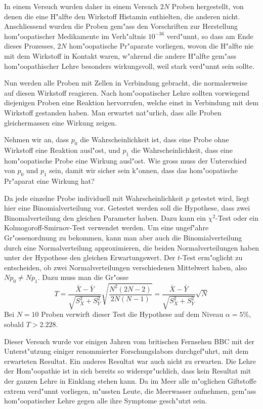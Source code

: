 In einem Versuch wurden daher in einem Versuch $2N$ Proben hergestellt,
von denen die eine H"alfte den Wirkstoff Histamin enthielten, die anderen 
nicht.
Anschliessend wurden die Proben gem"ass den Vorschriften zur
Herstellung hom"oopatischer Medikamente im Verh"altnis $10^{-36}$
verd"unnt, so dass am Ende dieses Prozesses, $2N$ hom"oopatische
Pr"aparate vorliegen, wovon die H"alfte nie mit dem Wirkstoff in
Kontakt waren, w"ahrend die andere H"alfte gem"ass hom"oopathischer
Lehre besonders wirkungsvoll, weil stark verd"unnt sein sollte.

Nun werden alle Proben mit Zellen in Verbindung gebracht, die normalerweise
auf diesen Wirkstoff reagieren.
Nach hom"oopatischer Lehre sollten vorwiegend
diejenigen Proben eine Reaktion hervorrufen, welche einst in Verbindung
mit dem Wirkstoff gestanden haben.
Man erwartet nat"urlich, dass 
alle Proben gleichermassen eine Wirkung zeigen.

Nehmen wir an, dass $p_0$ die Wahrscheinlichkeit ist, dass eine Probe ohne
Wirkstoff eine Reaktion ausl"ost, und $p_1$ die Wahrscheinlichkeit, dass
eine hom"oopatische Probe eine Wirkung ausl"ost.
Wie gross muss der Unterschied
von $p_0$ und $p_1$ sein, damit wir sicher sein k"onnen, dass das hom"oopatische
Pr"aparat eine Wirkung hat?

Da jede einzelne Probe individuell mit Wahrscheinlichkeit $p$ getestet wird, liegt
hier eine Binomialverteilung vor.
Getestet werden soll die Hypothese, dass zwei
Binomalverteilung den gleichen Parameter haben.
Dazu kann ein $\chi^2$-Test oder
ein Kolmogoroff-Smirnov-Test verwendet werden.
Um eine ungef"ahre Gr"ossenordnung
zu bekommen, kann man aber auch die Binomialverteilung durch eine Normalverteilung
approximieren, die beiden Normalverteilungen haben unter der Hypothese den
gleichen Erwartungswert.
Der $t$-Test erm"oglicht zu entscheiden, ob zwei Normalverteilungen
verschiedenen Mittelwert haben, also $Np_0\ne Np_1$.
Dazu muss man die
Gr"osse
$$T=\frac{\bar X - \bar Y}{\sqrt{S_X^2+S_Y^2}}\sqrt{\frac{N^2(2N-2)}{{2N}{(N-1)}}}
=
\frac{\bar X - \bar Y}{\sqrt{S_X^2+S_Y^2}}\sqrt{N}$$
Bei $N=10$ Proben verwirft dieser Test die Hypothese
auf dem Niveau $\alpha=5\%$, sobald
$T>2.228$.

Dieser Versuch wurde vor einigen Jahren vom britischen Fernsehen BBC mit der
Unterst"utzung einiger renommierter Forschungslabors durchgef"uhrt, mit dem
erwarteten Resultat.
Ein anderes Resultat war auch nicht zu erwarten.
Die Lehre der Hom"oopathie
ist in sich bereits so widerspr"uchlich, dass kein Resultat mit der ganzen
Lehre in Einklang stehen kann.
Da im Meer alle m"oglichen Giftstoffe extrem verd"unnt vorliegen, m"ussten
Leute, die Meerwasser aufnehmen, gem"ass hom"oopatischer Lehre gegen alle
ihre Symptome gesch"utzt sein.

